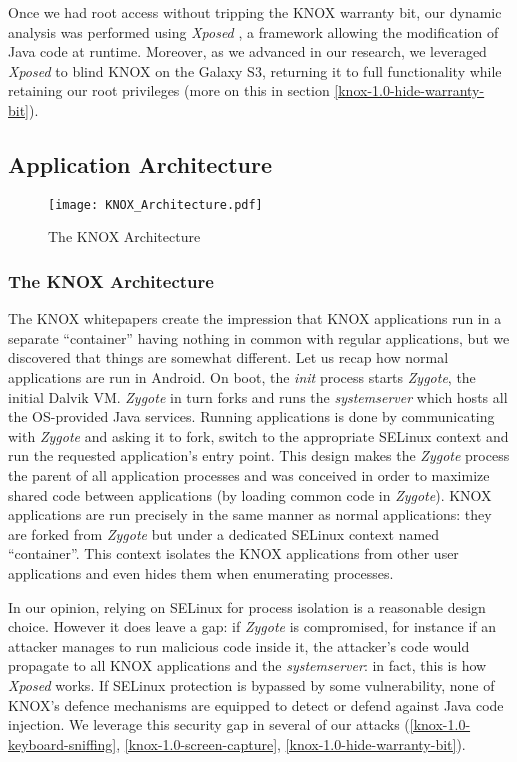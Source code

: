 \documentclass[11pt]{article}
\begin{document}
Once we had root access without tripping the KNOX warranty bit, our dynamic analysis was performed using \emph{Xposed} \cite{Xposed}, 
a framework allowing the modification of Java code at runtime. 
Moreover, as we advanced in our research, we leveraged \emph{Xposed} to blind KNOX on the Galaxy S3, returning it to full functionality 
while retaining our root privileges (more on this in section \ref{knox-1.0-hide-warranty-bit}).

\subsection{Application Architecture}

\begin{figure*}
  \centering
    \caption{The KNOX Architecture}
    \texttt{[image: KNOX\_Architecture.pdf]}
    \label{fig:knox-architecture}
\end{figure*}

\subsubsection{The KNOX Architecture} \label{knox-1.0-architecture}
The KNOX whitepapers create the impression that KNOX applications run in a separate ``container'' having nothing in common with 
regular applications, but we discovered that things are somewhat different. 
Let us recap how normal applications are run in Android. On boot, the \emph{init} process starts \emph{Zygote}, the initial Dalvik VM. 
\emph{Zygote} in turn forks and runs the \emph{system\textunderscore server} which hosts all the OS-provided Java services. Running applications is done 
by communicating with \emph{Zygote} and asking it to fork, switch to the appropriate SELinux context and run the requested application's entry point. 
This design makes the \emph{Zygote} process the parent of all application processes and was conceived in order to maximize shared code between 
applications (by loading common code in \emph{Zygote}).
KNOX applications are run precisely in the same manner as normal applications: they are forked from \emph{Zygote} but under a 
dedicated SELinux context named ``container''. 
This context isolates the KNOX applications from other user applications and even hides them when enumerating processes. 

In our opinion, relying on SELinux for process isolation is a reasonable design choice. However it does leave a gap: if \emph{Zygote} is compromised, 
for instance if an attacker manages to run malicious code inside it, the attacker's code would propagate to all KNOX applications and the 
\emph{system\textunderscore server}: in fact, this is how \emph{Xposed} works. If SELinux protection is bypassed by some vulnerability, 
none of KNOX's defence mechanisms are equipped to detect or defend against Java code injection. We leverage this security gap in several of our attacks 
(\ref{knox-1.0-keyboard-sniffing}, \ref{knox-1.0-screen-capture}, \ref{knox-1.0-hide-warranty-bit}).
\end{document}
